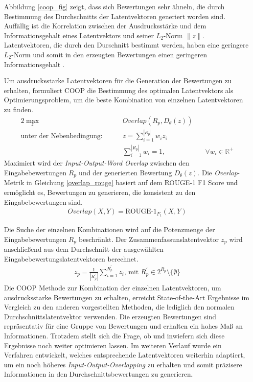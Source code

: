 Abbildung \ref{coop_fig} zeigt, dass sich Bewertungen sehr ähneln, die durch Bestimmung des Durchschnitts der Latentvektoren generiert worden sind. 
Auffällig ist die Korrelation zwischen der Ausdrucksstärke und dem Informationsgehalt eines Latentvektors und seiner $L_2$-Norm $\| z \|$.
Latentvektoren, die durch den Durschnitt bestimmt werden, haben eine geringere $L_2$-Norm und somit in den erzeugten Bewertungen einen geringeren Informationsgehalt \citep{coop}.

Um ausdrucksstarke Latentvektoren für die Generation der Bewertungen zu erhalten, formuliert COOP \citep{coop} die Bestimmung des optimalen Latentvektors als Optimierungsproblem, um die beste Kombination von einzelnen Latentvektoren zu finden.
\begin{alignat}{2}
    \max_z              &\quad&  Overlap(R_p, D_\theta(z))    & \\
    \text{unter der Nebenbedingung: } &\quad&  z = \sum_{i=1}^{|R_p|} w_i z_i \\
                         &\quad&  \sum_{i=1}^{|R_p|}w_i=1,                        &\quad \forall w_i \in \mathbb{R}^+
\end{alignat}
Maximiert wird der \textit{Input-Output-Word Overlap} zwischen den Eingabebewertungen $R_p$ und der generierten Bewertung $D_\theta(z)$. 
Die \textit{Overlap}-Metrik in Gleichung \ref{overlap_rouge} basiert auf dem ROUGE-1 F1 Score und ermöglicht es, Bewertungen zu generieren, die konsistent zu den Eingabebewertungen sind.
\begin{align}
    \label{overlap_rouge}
    Overlap(X,Y) = \text{ROUGE-1}_{F_1}(X,Y)
\end{align}

Die Suche der einzelnen Kombinationen wird auf die Potenzmenge der Eingabebewertungen $R_p$ beschränkt. 
Der Zusammenfassunslatentvektor $z_p$ wird anschließend aus dem Durchschnitt der ausgewählten Eingabebewertungslatentvektoren berechnet.
\begin{align}
z_p = \frac{1}{|R_p^{'}|} \sum_{i=1}^{R_p^{'}}z_i \text{, mit } R_p^{'} \in 2^{R_p} \setminus  \{ \emptyset\}
\end{align}
Die COOP Methode zur Kombination der einzelnen Latentvektoren, um ausdrucksstarke Bewertungen zu erhalten, erreicht State-of-the-Art Ergebnisse im Vergleich zu den anderen vorgestellten Methoden, die lediglich den normalen Durchschnittslatentvektor verwenden.
Die erzeugten Bewertungen sind repräsentativ für eine Gruppe von Bewertungen und erhalten ein hohes Maß an Informationen. 
Trotzdem stellt sich die Frage, ob und inwiefern sich diese Ergebnisse noch weiter optimieren lassen.
Im weiteren Verlauf wurde ein Verfahren entwickelt, welches entsprechende Latentvektoren weiterhin adaptiert, um ein noch höheres \textit{Input-Output-Overlapping} zu erhalten und somit präzisere Informationen in den Durchschnittsbewertungen zu generieren.


